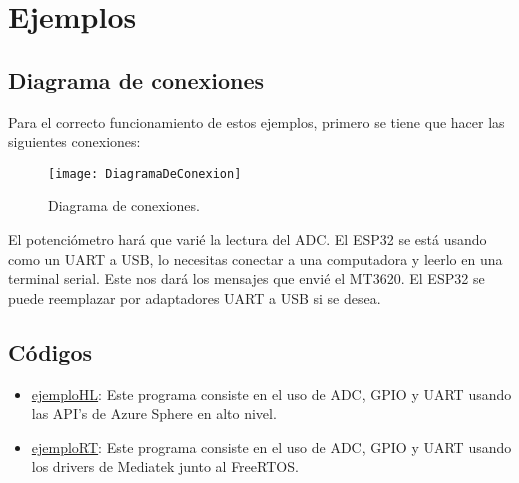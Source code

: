 \section{Ejemplos}
\subsection{Diagrama de conexiones}
Para el correcto funcionamiento de estos ejemplos, primero se tiene que hacer las siguientes conexiones:
\begin{figure}[h]
	\centering
	\texttt{[image: DiagramaDeConexion]}
	\caption{Diagrama de conexiones.}
\end{figure}
\linebreak
El potenciómetro hará que varié la lectura del ADC. El ESP32 se está usando como un UART a USB, lo necesitas conectar a una computadora y leerlo en una terminal serial. Este nos dará los mensajes que envié el MT3620. El ESP32 se puede reemplazar por adaptadores UART a USB si se desea.
\pagebreak
\subsection{Códigos}
\begin{itemize}
	\item 
	\href{https://github.com/Javier20060904/ejemplo_HL}{ejemplo\textunderscore HL}: Este programa consiste en el uso de ADC, GPIO y UART usando las API's de Azure Sphere en alto nivel.
	\item
	\href{https://github.com/Javier20060904/ejemplo_RT}{ejemplo\textunderscore RT}:  Este programa consiste en el uso de ADC, GPIO y UART usando los drivers de Mediatek junto al FreeRTOS.
\end{itemize}


